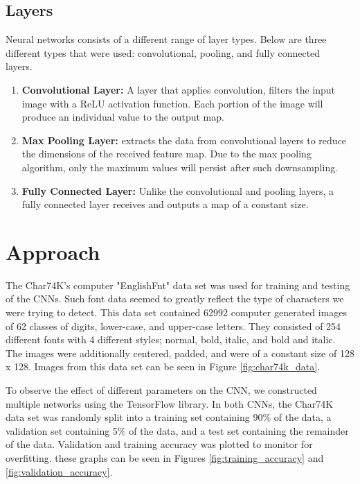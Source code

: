 \documentclass[11pt]{article}
\begin{document}
\subsection{Layers}
Neural networks consists of a different range of layer types.  Below are three different types that were used: convolutional, pooling, and fully connected layers.~\cite{aGuideToLayers17}
\begin{enumerate}
  \item \textbf{Convolutional Layer:} A layer that applies convolution, filters the input image with a ReLU activation function.  Each portion of the image will produce an individual value to the output map.~\cite{aGuideToLayers17}
  \item \textbf{Max Pooling Layer:} extracts the data from convolutional layers to reduce the dimensions of the received feature map.  Due to the max pooling algorithm, only the maximum values will persist after such downsampling.~\cite{aGuideToLayers17}
  \item \textbf{Fully Connected Layer:} Unlike the convolutional and pooling layers, a fully connected layer receives and outputs a map of a constant size.~\cite{aGuideToLayers17}
\end{enumerate}





\section{Approach}

    The Char74K's computer "EnglishFnt" data set was used for training and testing of the CNNs.  Such font data seemed to greatly reflect the type of characters we were trying to detect. This data set contained 62992 computer generated images of 62 classes of digits, lower-case, and upper-case letters. \cite{deCampos09} They consisted of 254 different fonts with 4 different styles; normal, bold, italic, and bold and italic. \cite{deCampos09} The images were additionally centered, padded, and were of a constant size of 128 x 128. \cite{deCampos09} Images from this data set can be seen in Figure \ref{fig:char74k_data}.
    
    To observe the effect of different parameters on the CNN, we constructed multiple networks using the TensorFlow library. In both CNNs, the Char74K data set was randomly split into a training set containing 90\% of the data, a validation set containing 5\% of the data, and a test set containing the remainder of the data. Validation and training accuracy was plotted to monitor for overfitting. these graphs can be seen in Figures \ref{fig:training_accuracy} and \ref{fig:validation_accuracy}.
    
\end{document}
